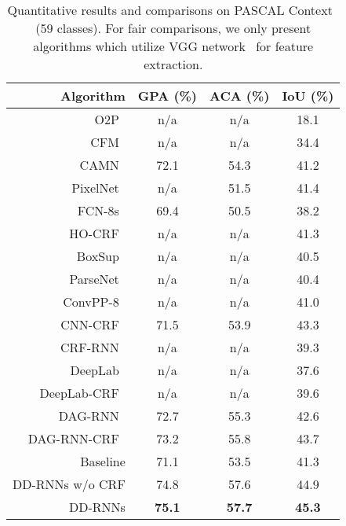 \documentclass[10pt,twocolumn,letterpaper]{article}
\begin{document}
\renewcommand\arraystretch{1.0}
\begin{table}[htbp]\small
  \centering
  \caption{Quantitative results and comparisons on PASCAL Context~\cite{mottaghi2014role} (59 classes). For fair comparisons, we only present algorithms which utilize VGG network~\cite{simonyan2014very} for feature extraction.}
    \begin{tabular}{r|ccc}
    \hline
    Algorithm & GPA (\%) & ACA (\%) & IoU (\%) \\
    \hline
    \hline
    O2P~\cite{carreira2012semantic}     & n/a     & n/a     & 18.1 \\
    CFM~\cite{dai2015convolutional}     & n/a     & n/a     & 34.4 \\
    CAMN~\cite{abdulnabi2017episodic}    & 72.1    & 54.3    & 41.2 \\
    PixelNet~\cite{bansal2017pixelnet} & n/a     & 51.5    & 41.4 \\
    FCN-8s~\cite{long2015fully}  & 69.4    & 50.5    & 38.2 \\
    HO-CRF~\cite{arnab2016higher}  & n/a     & n/a     & 41.3 \\
    BoxSup~\cite{dai2015boxsup}  & n/a     & n/a     & 40.5 \\
    ParseNet~\cite{liu2015parsenet} & n/a     & n/a     & 40.4 \\
    ConvPP-8~\cite{xie2016top} & n/a     & n/a     & 41.0 \\
    CNN-CRF~\cite{lin2016efficient} & 71.5    & 53.9    & 43.3 \\
    CRF-RNN~\cite{zheng2015conditional} & n/a     & n/a     & 39.3 \\
    DeepLab~\cite{chen2016deeplab} & n/a     & n/a     & 37.6 \\
    DeepLab-CRF~\cite{chen2016deeplab} & n/a     & n/a     & 39.6 \\
    DAG-RNN~\cite{shuai2017scene} & 72.7    & 55.3    & 42.6 \\
    DAG-RNN-CRF~\cite{shuai2017scene} & 73.2    & 55.8    & 43.7 \\
    \hline
    \hline
    Baseline & 71.1    & 53.5    & 41.3 \\
    DD-RNNs w/o CRF   &  74.8    & 57.6    &  44.9 \\
    DD-RNNs    & {\bf 75.1}    & {\bf 57.7}    & {\bf 45.3} \\
    \hline
    \end{tabular}%
  \label{tab:tab1}%
\end{table}%
\end{document}
